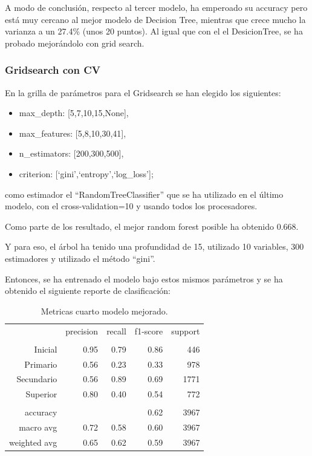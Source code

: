 \documentclass[a4paper]{article}
\begin{document}
            A modo de conclusión, respecto al tercer modelo, ha emperoado su accuracy pero está muy cercano al mejor modelo de Decision Tree, mientras que crece mucho la varianza a un 27.4\% (unos 20 puntos). 
            Al igual que con el el DesicionTree, se ha probado mejorándolo con grid search.

        \subsubsection{Gridsearch con CV}

            En la grilla de parámetros para el Gridsearch se han elegido los siguientes:
            \begin{itemize}
                \item max\_depth: [5,7,10,15,None],
                \item max\_features: [5,8,10,30,41],
                \item n\_estimators: [200,300,500],
                \item criterion: [`gini',`entropy',`log\_loss'];
            \end{itemize}
            como estimador el ``RandomTreeClassifier'' que se ha utilizado en el último modelo, con el cross-validation=10 y  usando todos los procesadores.

           Como parte de los resultado, el mejor random forest posible ha obtenido 0.668. 

            Y para eso, el árbol ha tenido una profundidad de 15, utilizado  10  variables,  300  estimadores y utilizado el método ``gini''.
            
            Entonces, se ha entrenado el modelo bajo estos mismos parámetros y se ha obtenido el siguiente reporte de clasificación:

            \begin{table}[!ht]
                \centering
                \begin{tabular}{rrrrr}
                    ~ & precision & recall & f1-score & support \\
                    & & & & \\
                    Inicial    & 0.95 & 0.79 & 0.86 & 446 \\
                    Primario   & 0.56 & 0.23 & 0.33 & 978 \\
                    Secundario & 0.56 & 0.89 & 0.69 & 1771 \\
                    Superior   & 0.80 & 0.40 & 0.54 & 772 \\
                    & & & & \\
                    accuracy & & & 0.62 & 3967 \\
                    macro avg & 0.72 & 0.58 & 0.60 & 3967 \\
                    weighted avg & 0.65 & 0.62 & 0.59 & 3967 \\
                \end{tabular}
                \caption{Metricas cuarto modelo mejorado.}
                \label{New fourth model metrics}
            \end{table}
            
\end{document}
